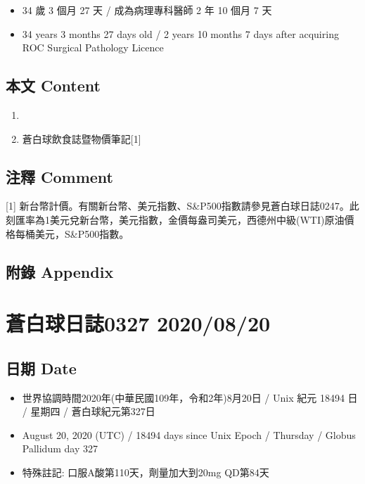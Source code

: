 \documentclass[a5paper, 11pt
]{book}
\providecommand{\tightlist}{%
  \setlength{\itemsep}{0pt}\setlength{\parskip}{0pt}}
\begin{document}
\begin{itemize}
\tightlist
\item
  34 歲 3 個月 27 天 / 成為病理專科醫師 2 年 10 個月 7 天
\item
  34 years 3 months 27 days old / 2 years 10 months 7 days after
  acquiring ROC Surgical Pathology Licence
\end{itemize}

\hypertarget{ux672cux6587-content-79}{%
\subsection{本文 Content}\label{ux672cux6587-content-79}}

\begin{enumerate}
\def\labelenumi{\arabic{enumi}.}
\tightlist
\item
\item
  蒼白球飲食誌暨物價筆記{[}1{]}
\end{enumerate}

\hypertarget{ux6ce8ux91cb-comment-79}{%
\subsection{注釋 Comment}\label{ux6ce8ux91cb-comment-79}}

{[}1{]}
新台幣計價。有關新台幣、美元指數、S\&P500指數請參見蒼白球日誌0247。此刻匯率為1美元兌新台幣，美元指數，金價每盎司美元，西德州中級(WTI)原油價格每桶美元，S\&P500指數。

\hypertarget{ux9644ux9304-appendix-79}{%
\subsection{附錄 Appendix}\label{ux9644ux9304-appendix-79}}

\hypertarget{ux84bcux767dux7403ux65e5ux8a8c0327-20200820}{%
\section{蒼白球日誌0327
2020/08/20}\label{ux84bcux767dux7403ux65e5ux8a8c0327-20200820}}

\hypertarget{ux65e5ux671f-date-80}{%
\subsection{日期 Date}\label{ux65e5ux671f-date-80}}

\begin{itemize}
\tightlist
\item
  世界協調時間2020年(中華民國109年，令和2年)8月20日 / Unix 紀元 18494 日
  / 星期四 / 蒼白球紀元第327日
\item
  August 20, 2020 (UTC) / 18494 days since Unix Epoch / Thursday /
  Globus Pallidum day 327
\item
  特殊註記: 口服A酸第110天，劑量加大到20mg QD第84天
\end{itemize}
\end{document}
